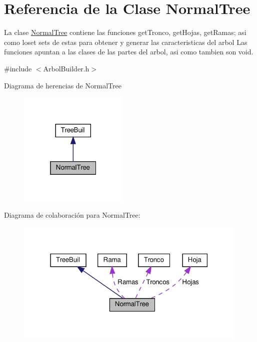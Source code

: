 \hypertarget{classNormalTree}{}\section{Referencia de la Clase Normal\+Tree}
\label{classNormalTree}


La clase \hyperlink{classNormalTree}{Normal\+Tree} contiene las funciones get\+Tronco, get\+Hojas, get\+Ramas; asi como loset sets de estas para obtener y generar las caracteristicas del arbol  Las funciones apuntan a las clases de las partes del arbol, asi como tambien son void.  




{\ttfamily \#include $<$Arbol\+Builder.\+h$>$}



Diagrama de herencias de Normal\+Tree
\nopagebreak
\begin{figure}[H]
\begin{center}
\leavevmode
\includegraphics[width=148pt]{classNormalTree__inherit__graph}
\end{center}
\end{figure}


Diagrama de colaboración para Normal\+Tree\+:
\nopagebreak
\begin{figure}[H]
\begin{center}
\leavevmode
\includegraphics[width=315pt]{classNormalTree__coll__graph}
\end{center}
\end{figure}

